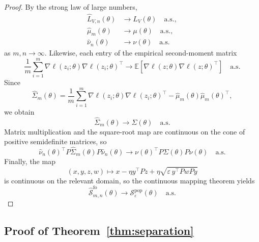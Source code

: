 \documentclass{article}
\newcommand{\EE}{\mathbb{E}}
\begin{document}
\begin{proof}
By the strong law of large numbers,
\begin{align}
    \hat L_{V,n}(\theta) &\to L_V(\theta) \quad \text{a.s.},\\
    \hat \mu_m(\theta) &\to \mu(\theta) \quad \text{a.s.},\\
    \hat \nu_n(\theta) &\to \nu(\theta) \quad \text{a.s.}
\end{align}
as $m,n \to \infty$. Likewise, each entry of the empirical second-moment matrix
\begin{equation}
    \frac{1}{m}\sum_{i=1}^{m}\nabla \ell(z_i;\theta)\nabla \ell(z_i;\theta)^\top
    \to
    \EE\left[\nabla \ell(z;\theta)\nabla \ell(z;\theta)^\top\right]
    \quad \text{a.s.}
\end{equation}
Since
\begin{equation}
    \hat \Sigma_m(\theta)
    =
    \frac{1}{m}\sum_{i=1}^{m}\nabla \ell(z_i;\theta)\nabla \ell(z_i;\theta)^\top
    -
    \hat \mu_m(\theta)\hat \mu_m(\theta)^\top,
\end{equation}
we obtain
\begin{equation}
    \hat \Sigma_m(\theta) \to \Sigma(\theta) \quad \text{a.s.}
\end{equation}
Matrix multiplication and the square-root map are continuous on the cone of positive semidefinite matrices, so
\begin{equation}
    \hat \nu_n(\theta)^\top P \hat \Sigma_m(\theta) P \hat \nu_n(\theta)
    \to
    \nu(\theta)^\top P \Sigma(\theta) P \nu(\theta)
    \quad \text{a.s.}
\end{equation}
Finally, the map
\begin{equation}
    (x,y,z,w) \mapsto x - \eta y^\top P z + \eta \sqrt{\varepsilon\, y^\top P w P y}
\end{equation}
is continuous on the relevant domain, so the continuous mapping theorem yields
\begin{equation}
    \hat{\mathcal{S}}_{m,n}^{\mathrm{fo}}(\theta)
    \to
    \mathcal{S}_{\varepsilon}^{\mathrm{pop}}(\theta)
    \quad \text{a.s.}
\end{equation}
\end{proof}

\subsection{Proof of Theorem~\ref{thm:separation}}
\end{document}
